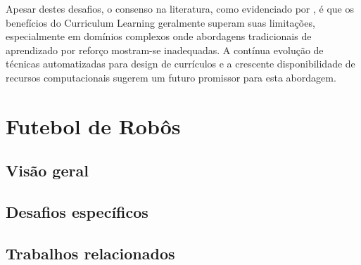 Apesar destes desafios, o consenso na literatura, como evidenciado por \cite{https://arxiv.org/abs/2101.10382}, é que os benefícios do Curriculum Learning geralmente superam suas limitações, especialmente em domínios complexos onde abordagens tradicionais de aprendizado por reforço mostram-se inadequadas. A contínua evolução de técnicas automatizadas para design de currículos e a crescente disponibilidade de recursos computacionais sugerem um futuro promissor para esta abordagem.

\section{Futebol de Robôs}
\label{sec:futebol_robos}

\subsection{Visão geral}
\label{subsec:futebol_visao}

\subsection{Desafios específicos}
\label{subsec:futebol_desafios}

\subsection{Trabalhos relacionados}
\label{subsec:futebol_trabalhos}